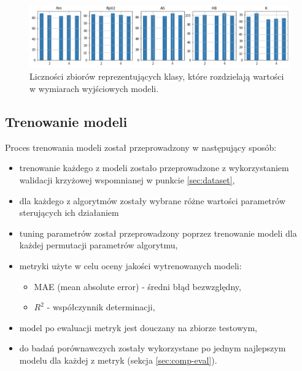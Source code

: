 \begin{figure}[ht]{}
	\centering
	\includegraphics[scale=0.6]{images/bins.png}
	\caption {
		 Liczności zbiorów reprezentujących klasy, które rozdzielają wartości w wymiarach wyjściowych modeli.
	}
	\label{fig:bins}
\end{figure}
\FloatBarrier

\subsection{Trenowanie modeli}
Proces trenowania modeli został przeprowadzony w następujący sposób:
\begin{itemize}
    \item trenowanie każdego z modeli zostało przeprowadzone z wykorzystaniem walidacji krzyżowej wspomnianej w punkcie \ref{sec:dataset},
    \item dla każdego z algorytmów zostały wybrane różne wartości parametrów sterujących ich działaniem
    \item tuning parametrów został przeprowadzony poprzez trenowanie modeli dla każdej permutacji parametrów algorytmu,
    \item metryki użyte w celu oceny jakości wytrenowanych modeli: \begin{itemize}
        \item MAE (mean absolute error) - średni błąd bezwzględny,
        \item $R^{2}$ - współczynnik determinacji,
    \end{itemize}
    \item model po ewaluacji metryk jest douczany na zbiorze testowym,
    \item do badań porównawczych zostały wykorzystane po jednym najlepszym modelu dla każdej z metryk (sekcja \ref{sec:comp-eval}).
\end{itemize}

